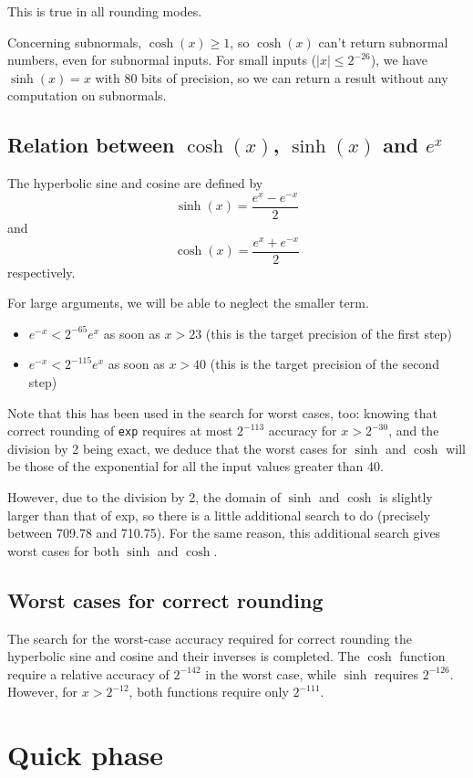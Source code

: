 This is true in all rounding modes.

Concerning subnormals, $\cosh(x) \geq 1$, so $\cosh(x)$ can't return
subnormal numbers, even for subnormal inputs.  For small inputs ($|x|
\leq 2^{-26}$), we have $\sinh(x) = x$ with 80 bits of precision, so
we can return a result without any computation on subnormals.

\subsection{Relation between $\cosh(x)$, $\sinh(x)$ and $e^x$}

The hyperbolic sine and cosine are defined by 
 $$\sinh(x) = \frac{e^x -  e^{-x}}{2}$$ 
and
 $$\cosh(x) = \frac{e^x +  e^{-x}}{2}$$
respectively.

For large arguments, we will be able to neglect the smaller term.
\begin{itemize}
\item $e^{-x}<2^{-65}e^x$ as soon as $x>23$ (this is the target precision of the first step) 
\item $e^{-x}<2^{-115}e^x$ as soon as $x>40$ (this is the target precision of the second step)
\end{itemize}

Note that this has been used in the search for worst cases, too:
knowing that correct rounding of \texttt{exp} requires at most
$2^{-113}$ accuracy for $x>2^{-30}$, and the division by 2 being
exact, we deduce that the worst cases for $\sinh$ and $\cosh$ will be
those of the exponential for all the input values greater
than 40.


However, due to the division by 2, the domain of $\sinh$ and $\cosh$
is slightly larger than that of exp, so there is a little additional
search to do (precisely between 709.78 and 710.75). For the same
reason, this additional search gives worst cases for both $\sinh$ and
$\cosh$.


\subsection{Worst cases for correct rounding}
The search for the worst-case accuracy required for correct rounding
the hyperbolic sine and cosine and their inverses is completed. The
$\cosh$ function require a relative accuracy of
$2^{-142}$ in the worst case, while $\sinh$ requires
$2^{-126}$. However, for $x>2^{-12}$, both functions require only
$2^{-111}$.


\section{Quick phase}

